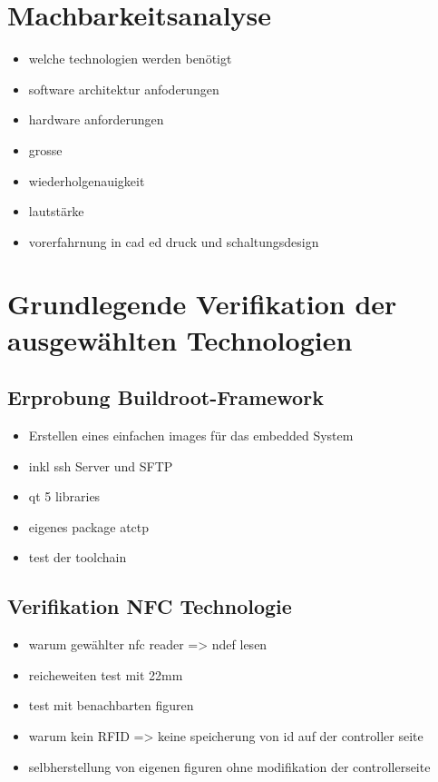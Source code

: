\hypertarget{machbarkeitsanalyse}{%
\chapter{Machbarkeitsanalyse}\label{machbarkeitsanalyse}}

\begin{itemize}
\tightlist
\item
  welche technologien werden benötigt
\item
  software architektur anfoderungen
\item
  hardware anforderungen
\item
  grosse
\item
  wiederholgenauigkeit
\item
  lautstärke
\item
  vorerfahrnung in cad ed druck und schaltungsdesign
\end{itemize}

\hypertarget{grundlegende-verifikation-der-ausgewuxe4hlten-technologien}{%
\chapter{Grundlegende Verifikation der ausgewählten
Technologien}\label{grundlegende-verifikation-der-ausgewuxe4hlten-technologien}}

\hypertarget{erprobung-buildroot-framework}{%
\section{Erprobung
Buildroot-Framework}\label{erprobung-buildroot-framework}}

\begin{itemize}
\tightlist
\item
  Erstellen eines einfachen images für das embedded System
\item
  inkl ssh Server und SFTP
\item
  qt 5 libraries
\item
  eigenes package atctp
\item
  test der toolchain
\end{itemize}

\hypertarget{verifikation-nfc-technologie}{%
\section{Verifikation NFC
Technologie}\label{verifikation-nfc-technologie}}

\begin{itemize}
\tightlist
\item
  warum gewählter nfc reader =\textgreater{} ndef lesen
\item
  reicheweiten test mit 22mm
\item
  test mit benachbarten figuren
\item
  warum kein RFID =\textgreater{} keine speicherung von id auf der
  controller seite
\item
  selbherstellung von eigenen figuren ohne modifikation der
  controllerseite
\end{itemize}

